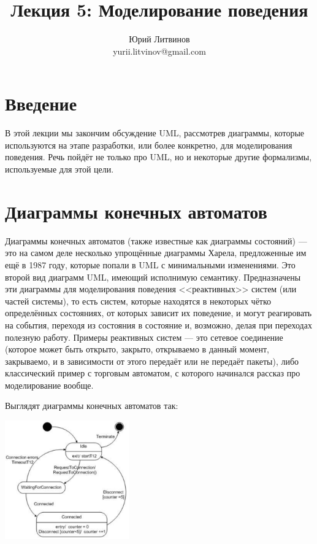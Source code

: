 \documentclass[a5paper]{article}
\title{Лекция 5:  Моделирование поведения}
\author{Юрий Литвинов\\\small{yurii.litvinov@gmail.com}}
\date{}
\begin{document}
\maketitle
\thispagestyle{empty}

\section{Введение}

В этой лекции мы закончим обсуждение UML, рассмотрев диаграммы, которые используются на этапе разработки, или более конкретно, для моделирования поведения. Речь пойдёт не только про UML, но и некоторые другие формализмы, используемые для этой цели.

\section{Диаграммы конечных автоматов}

Диаграммы конечных автоматов (также известные как диаграммы состояний) --- это на самом деле несколько упрощённые диаграммы Харела, предложенные им ещё в 1987 году, которые попали в UML с минимальными изменениями. Это второй вид диаграмм UML, имеющий исполнимую семантику. Предназначены эти диаграммы для моделирования поведения <<реактивных>> систем (или частей системы), то есть систем, которые находятся в некоторых чётко определённых состояниях, от которых зависит их поведение, и могут реагировать на события, переходя из состояния в состояние и, возможно, делая при переходах полезную работу. Примеры реактивных систем --- это сетевое соединение (которое может быть открыто, закрыто, открываемо в данный момент, закрываемо, и в зависимости от этого передаёт или не передаёт пакеты), либо классический пример с торговым автоматом, с которого начинался рассказ про моделирование вообще.

Выглядят диаграммы конечных автоматов так:

\begin{center}
    \includegraphics[width=0.4\textwidth]{stateTransitionExample.png}
\end{center}
\end{document}

